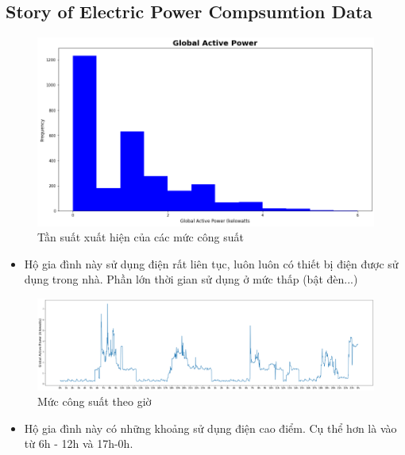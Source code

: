 \documentclass[a4paper, 12pt]{article}
\begin{document}
\clearpage
    
    \subsection{Story of Electric Power Compsumtion Data}
        \begin{figure}[H]
            \centering
            \includegraphics[scale=0.5]{img/GAP.png}
            \caption{Tần suất xuất hiện của các mức công suất}
        \end{figure}
        
        \begin{itemize}
            \item Hộ gia đình này sử dụng điện rất liên tục, luôn luôn có thiết bị điện được sử dụng trong nhà. Phần lớn thời gian sử dụng ở mức thấp (bật đèn...)
        \end{itemize}
        
        \begin{figure}[H]
            \centering
            \includegraphics[scale=0.3]{img/GAP-hours.png}
            \caption{Mức công suất theo giờ}
        \end{figure}
        
        \begin{itemize}
            \item Hộ gia đình này có những khoảng sử dụng điện cao điểm. Cụ thể hơn là vào từ 6h - 12h và 17h-0h.
        \end{itemize}
        
\end{document}
